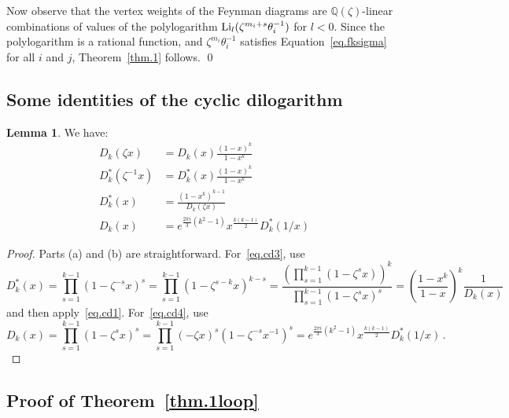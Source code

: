 \documentclass[12pt]{amsart}
\theoremstyle{definition}
\newtheorem{lemma}[theorem]{Lemma}
\def\BQ{\mathbb Q}
\def\th{\theta}
\newcommand{\Li}{{\rm Li}}
\begin{document}
Now observe that the vertex weights of the Feynman diagrams are 
$\BQ(\zeta)$-linear combinations of values of the polylogarithm 
$\Li_l(\zeta^{m_i+s}\th_i^{-1})$ for $l <0$. Since the polylogarithm
is a rational function, and $\zeta^{m_i}\th_i^{-1}$ satisfies 
Equation~\eqref{eq.fksigma} for all $i$ and $j$, Theorem~\ref{thm.1} follows.
\qed

\subsection{Some identities of the cyclic dilogarithm}
\label{sub.cyclicdilog}

\begin{lemma}
\label{lem.cyclic}
We have:
\begin{subequations}
\begin{align}
\label{eq.cd1}
D_k(\zeta x) &= D_k(x) \frac{(1-x)^k}{1-x^k} \\
\label{eq.cd2}
D^*_k(\zeta^{-1} x) &= D^*_k(x) \frac{(1-x)^k}{1-x^k} \\
\label{eq.cd3}
D_k^*(x) & =\frac{(1-x^k)^{k-1}}{D_k(\zeta x)} \\
\label{eq.cd4}
D_k(x)   & = e^{\frac{2 \pi i}{3} (k^2-1)}
x^{\frac{k(k-1)}{2}} D^*_k(1/x)
\end{align}
\end{subequations}
\end{lemma}

\begin{proof} Parts (a) and (b) are straightforward.
For~\eqref{eq.cd3}, use
$$
D^*_k(x)=\prod_{s=1}^{k-1}(1-\zeta^{-s}x)^s
=\prod_{s=1}^{k-1}(1-\zeta^{s-k}x)^{k-s}
=\frac{\left(\prod_{s=1}^{k-1}(1-\zeta^{s}x)\right)^k}{
\prod_{s=1}^{k-1}(1-\zeta^{s}x)^{s}} = \left(\frac{1-x^k}{1-x}\right)^k 
\frac{1}{D_k(x)}
$$
and then apply~\eqref{eq.cd1}. For~\eqref{eq.cd4}, use
$$
D_k(x)=\prod_{s=1}^{k-1}(1-\zeta^{s}x)^s= \prod_{s=1}^{k-1} (-\zeta x)^{s}
(1- \zeta^{-s} x^{-1})^s = e^{\frac{2 \pi i}{3} (k^2-1)}
x^{\frac{k(k-1)}{2}} D^*_k(1/x)
\,.
$$
\end{proof}

\subsection{Proof of Theorem~\ref{thm.1loop}}
\label{sub.proof.1loop}
\end{document}

